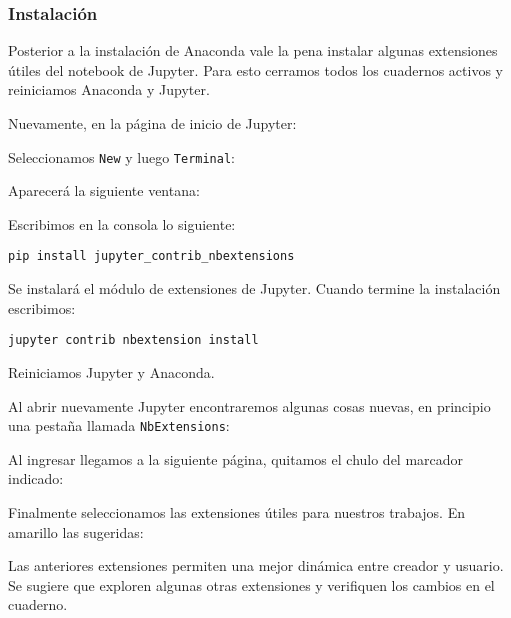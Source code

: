 \documentclass[11pt]{article}
\begin{document}
    \hypertarget{instalaciuxf3n}{%
\subsubsection{Instalación}\label{instalaciuxf3n}}

Posterior a la instalación de Anaconda vale la pena instalar algunas
extensiones útiles del notebook de Jupyter. Para esto cerramos todos los
cuadernos activos y reiniciamos Anaconda y Jupyter.

Nuevamente, en la página de inicio de Jupyter:

Seleccionamos \texttt{New} y luego \texttt{Terminal}:

Aparecerá la siguiente ventana:

Escribimos en la consola lo siguiente:

\texttt{pip\ install\ jupyter\_contrib\_nbextensions}

Se instalará el módulo de extensiones de Jupyter. Cuando termine la
instalación escribimos:

\texttt{jupyter\ contrib\ nbextension\ install}

Reiniciamos Jupyter y Anaconda.

    Al abrir nuevamente Jupyter encontraremos algunas cosas nuevas, en
principio una pestaña llamada \texttt{NbExtensions}:

Al ingresar llegamos a la siguiente página, quitamos el chulo del
marcador indicado:

Finalmente seleccionamos las extensiones útiles para nuestros trabajos.
En amarillo las sugeridas:

    Las anteriores extensiones permiten una mejor dinámica entre creador y
usuario. Se sugiere que exploren algunas otras extensiones y verifiquen
los cambios en el cuaderno.


    
    
    
\end{document}
